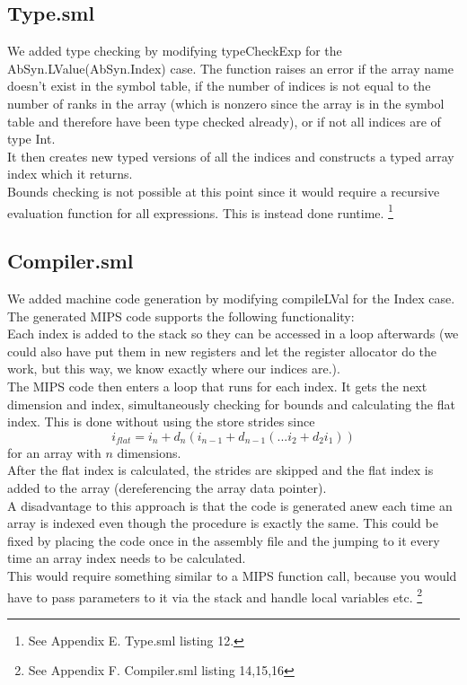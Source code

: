 \documentclass[12pt,a4paper,english]{article}
\begin{document}
\subsection{Type.sml}
We added type checking by modifying typeCheckExp for the AbSyn.LValue(AbSyn.Index) case. The function raises an error if the array name doesn't exist in the symbol table, if the number of indices is not equal to the number of ranks in the array (which is nonzero since the array is in the symbol table and therefore have been type checked already), or if not all indices are of type Int. \\
It then creates new typed versions of all the indices and constructs a typed array index which it returns. \\
Bounds checking is not possible at this point since it would require a recursive evaluation function for all expressions. This is instead done runtime.
\footnote{See Appendix E. Type.sml listing 12.}

\subsection{Compiler.sml}
We added machine code generation by modifying compileLVal for the Index case. The generated MIPS code supports the following functionality: \\
Each index is added to the stack so they can be accessed in a loop afterwards (we could also have put them in new registers and let the register allocator do the work, but this way, we know exactly where our indices are.). \\ 
The MIPS code then enters a loop that runs for each index. It gets the next dimension and index, simultaneously checking for bounds and calculating the flat index. This is done without using the store strides since
\[i_{flat} = i_n + d_n(i_{n-1} + d_{n-1}(... i_2 + d_2i_1))\]
for an array with $n$ dimensions. \\
After the flat index is calculated, the strides are skipped and the flat index is added to the array (dereferencing the array data pointer). \\

A disadvantage to this approach is that the code is generated anew each time an array is indexed even though the procedure is exactly the same. This could be fixed by placing the code once in the assembly file and the jumping to it every time an array index needs to be calculated. \\
This would require something similar to a MIPS function call, because you would have to pass parameters to it via the stack and handle local variables etc. 
\footnote{See Appendix F. Compiler.sml listing 14,15,16}
\end{document}
